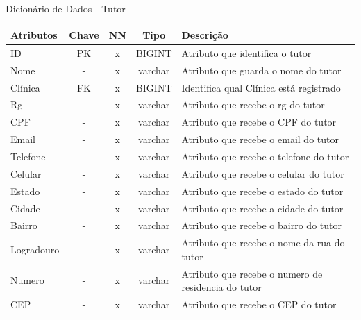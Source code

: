 \documentclass[
    12pt,               %
    openright,          %
    oneside,
    a4paper,            %
    BIBLATEX,           %
    TODO,               %
    english,            %
    brazil              %
    ]{ifsp-spo-inf-ctds}
\begin{document}
    \begin{center}
      \begin{quadro}[H]
      \centering
          \caption{Dicionário de Dados - Tutor}
          \begin{tabulary}{1.0\textwidth}{|p{9em}|c|c|c|p{19em}|}
        \hline
        Atributos & Chave & NN & Tipo & Descrição\\
        \hline
        ID & PK & x & BIGINT & Atributo que identifica o tutor \\
        \hline
        Nome & - & x & varchar & Atributo que guarda o nome do tutor\\
        \hline
        Clínica & FK & x & BIGINT & Identifica qual Clínica está registrado\\
        \hline
        Rg & - & x & varchar & Atributo que recebe o rg do tutor \\
        \hline
        CPF & - & x & varchar & Atributo que recebe o CPF do tutor\\
        \hline
        Email & - & x & varchar & Atributo que recebe o email do tutor\\
        \hline
        Telefone & - & x & varchar & Atributo que recebe o telefone do tutor\\
        \hline
        Celular & - & x & varchar & Atributo que recebe o celular do tutor\\
        \hline
        Estado & - & x & varchar & Atributo que recebe o estado do tutor\\
        \hline
        Cidade & - & x & varchar & Atributo que recebe a cidade do tutor\\
        \hline
        Bairro & - & x & varchar & Atributo que recebe o bairro do tutor\\
        \hline
        Logradouro & - & x & varchar & Atributo que recebe o nome da rua do tutor\\
        \hline
        Numero & - & x & varchar & Atributo que recebe o numero de residencia do tutor\\
        \hline
        CEP & - & x & varchar & Atributo que recebe o CEP do tutor\\
        \hline
        \end{tabulary}
         
          \label{qd: md-tutor}
      \end{quadro}
    \end{center}
    
\end{document}
